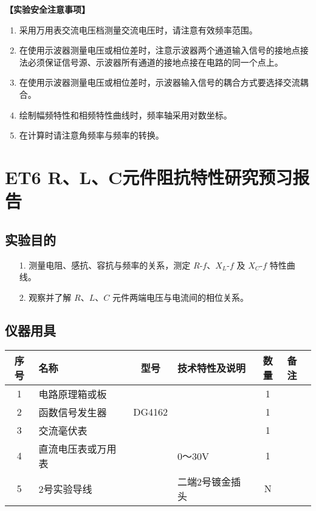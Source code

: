 \documentclass[dvipsnames, svgnames,a4paper,11pt]{article}
\begin{document}
	
	\textbf{【实验安全注意事项】}	
	\begin{enumerate}
		\item 采用万用表交流电压档测量交流电压时，请注意有效频率范围。
		\item 在使用示波器测量电压或相位差时，注意示波器两个通道输入信号的接地点接法必须保证信号源、示波器所有通道的接地点接在电路的同一个点上。
		\item 在使用示波器测量电压或相位差时，示波器输入信号的耦合方式要选择交流耦合。
		\item 绘制幅频特性和相频特性曲线时，频率轴采用对数坐标。
		\item 在计算时请注意角频率与频率的转换。
	\end{enumerate}
	
	\clearpage
	\tableofcontents
	\clearpage
	
	
	
	
	\setcounter{section}{0}
	\section{ET6 R、L、C元件阻抗特性研究\quad\heiti 预习报告}
	
	\subsection{实验目的}
	\begin{enumerate}
		\item[1.] 测量电阻、感抗、容抗与频率的关系，测定 $R$-$f$、$X_L$-$f$ 及 $X_C$-$f$ 特性曲线。
		\item[2.] 观察并了解 $R$、$L$、$C$ 元件两端电压与电流间的相位关系。
	\end{enumerate}
	
	\subsection{仪器用具}
	\begin{table}[htbp]
		\centering
		\renewcommand\arraystretch{1.6}
		\begin{tabular}{|c|p{3cm}|c|p{5cm}|c|p{2cm}|}
			\hline
			序号 & 名称 & 型号 & 技术特性及说明 & 数量 & 备注 \\
			\hline
			1 & 电路原理箱或板 & & & 1 & \\
			2 & 函数信号发生器 & DG4162& & 1 & \\
			3 & 交流毫伏表 & & & 1 & \\
			4 & 直流电压表或万用表 &  & 0～30V& 1 & \\
			5 & 2号实验导线 & & 二端2号镀金插头 & N & \\
			\hline
		\end{tabular}
	\end{table}
	
\end{document}

